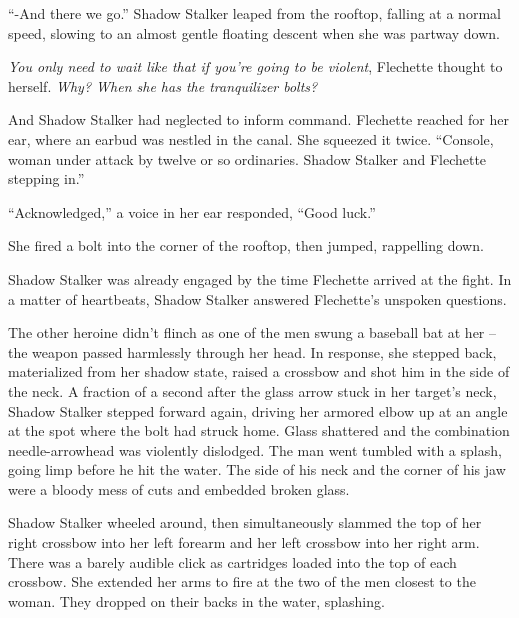 ``-And there we go.''  Shadow Stalker leaped from the rooftop, falling at a normal speed, slowing to an almost gentle floating descent when she was partway down.



\emph{You only need to wait like that if you're going to be violent}, Flechette thought to herself.  \emph{Why?  When she has the tranquilizer bolts?}



And Shadow Stalker had neglected to inform command.  Flechette reached for her ear, where an earbud was nestled in the canal. She squeezed it twice.  ``Console, woman under attack by twelve or so ordinaries.  Shadow Stalker and Flechette stepping in.''



``Acknowledged,'' a voice in her ear responded, ``Good luck.''



She fired a bolt into the corner of the rooftop, then jumped, rappelling down.



Shadow Stalker was already engaged by the time Flechette arrived at the fight.  In a matter of heartbeats, Shadow Stalker answered Flechette's unspoken questions.



The other heroine didn't flinch as one of the men swung a baseball bat at her – the weapon passed harmlessly through her head.  In response, she stepped back, materialized from her shadow state, raised a crossbow and shot him in the side of the neck.  A fraction of a second after the glass arrow stuck in her target's neck, Shadow Stalker stepped forward again, driving her armored elbow up at an angle at the spot where the bolt had struck home.  Glass shattered and the combination needle-arrowhead was violently dislodged.  The man went tumbled with a splash, going limp before he hit the water.  The side of his neck and the corner of his jaw were a bloody mess of cuts and embedded broken glass.



Shadow Stalker wheeled around, then simultaneously slammed the top of her right crossbow into her left forearm and her left crossbow into her right arm.  There was a barely audible click as cartridges loaded into the top of each crossbow.  She extended her arms to fire at the two of the men closest to the woman.  They dropped on their backs in the water, splashing.



